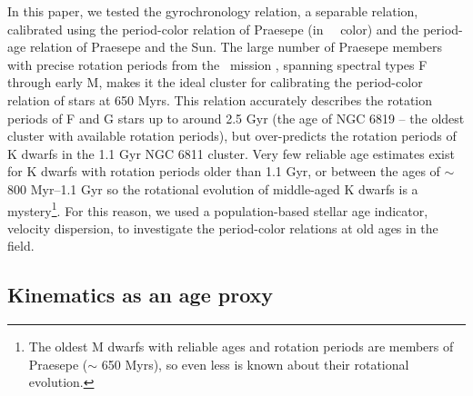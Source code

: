 In this paper, we tested the \citet{angus2019} gyrochronology relation, a
separable relation, calibrated using the period-color relation of Praesepe (in
\gaia\ \gcolor\ color) and the period-age relation of Praesepe and the Sun.
The large number of Praesepe members with precise rotation periods from the
\ktwo\ mission \citep{douglas2017, rebull2017}, spanning spectral types F
through early M, makes it the ideal cluster for calibrating the period-color
relation of stars at 650 Myrs.
This relation accurately describes the rotation periods of F and G stars up to
around 2.5 Gyr (the age of NGC 6819 -- the oldest cluster with available
rotation periods), but over-predicts the rotation periods of K dwarfs in the
1.1 Gyr NGC 6811 cluster.
Very few reliable age estimates exist for K dwarfs with rotation periods older
than 1.1 Gyr, or between the ages of $\sim$ 800 Myr--1.1 Gyr so the rotational
evolution of middle-aged K dwarfs is a mystery\footnote{The oldest M dwarfs
with reliable ages and rotation periods are members of Praesepe ($\sim$ 650
Myrs), so even less is known about their rotational evolution.}.
For this reason, we used a population-based stellar age indicator, velocity
dispersion, to investigate the period-color relations at old ages in the
field.

\subsection{Kinematics as an age proxy}

